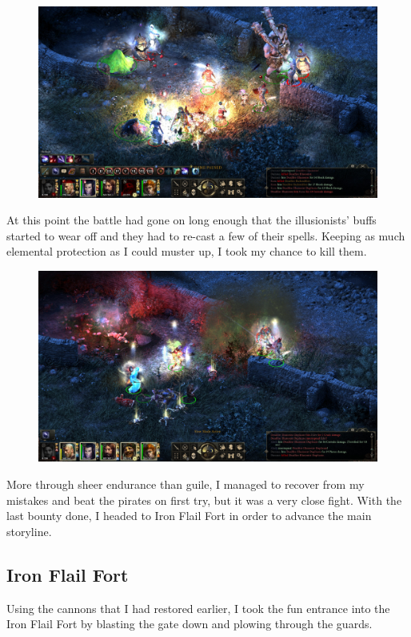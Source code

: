 \documentclass{article}
\begin{document}
\begin{figure}
\includegraphics[scale=0.33]{files/blog/2020_01_18_poe_potd_wmpt2/2020_01_18_bounty4_5.jpg}
\end{figure}

At this point the battle had gone on long enough that the illusionists' buffs started to wear off and they had to re-cast a few of their spells.  Keeping as much elemental protection as I could muster up, I took my chance to kill them.

\begin{figure}
\includegraphics[scale=0.33]{files/blog/2020_01_18_poe_potd_wmpt2/2020_01_18_bounty4_6.jpg}
\end{figure}

More through sheer endurance than guile, I managed to recover from my mistakes and beat the pirates on first try, but it was a very close fight.  With the last bounty done, I headed to Iron Flail Fort in order to advance the main storyline.

\subsection{Iron Flail Fort}
Using the cannons that I had restored earlier, I took the fun entrance into the Iron Flail Fort by blasting the gate down and plowing through the guards.
\end{document}
